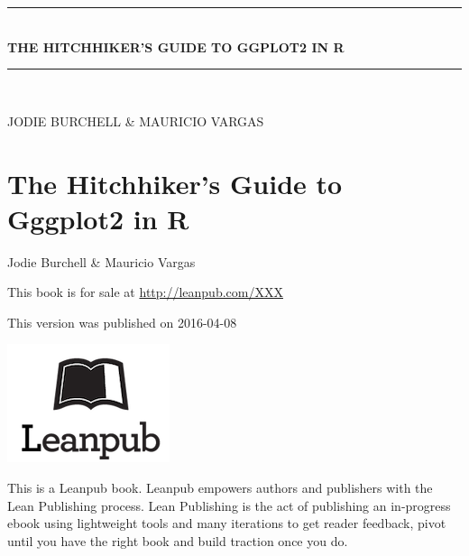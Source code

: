 \documentclass[11pt, oneside]{report}
\begin{document}
\begin{center} \end{center} %
\cleardoublepage

\newcommand{\HRule}{\rule{\linewidth}{0.5mm}}
\begin{titlepage}
{\sffamily 
	\begin{center}
		\vspace*{\fill}
		\HRule \\[0.4cm]{
		\huge \bfseries THE HITCHHIKER'S GUIDE TO GGPLOT2 IN R}\\ [0.4cm]
		\HRule \\[1.5cm]
		\begin{minipage}{0.9\textwidth}
		\begin{center}
		\large
		JODIE BURCHELL \& MAURICIO VARGAS
		\end{center}
		\end{minipage}
	\vfill
	\end{center}}
\end{titlepage}
\setcounter{page}{2}
\setlength\parindent{0pt} %
\renewcommand{\labelenumi}{\alph{enumi}.} %
\newpage

\chapter*{The Hitchhiker's Guide to Gggplot2 in R}

Jodie Burchell \& Mauricio Vargas

This book is for sale at \href{http://leanpub.com/XXX}{http://leanpub.com/XXX} 

This version was published on 2016-04-08

\includegraphics[scale=0.5]{leanpub}

This is a Leanpub book. Leanpub empowers authors and publishers with the Lean Publishing process. Lean Publishing is the act of publishing an in-progress ebook using lightweight tools and many iterations to get reader feedback, pivot until you have the right book and build traction once you do.
\end{document}

